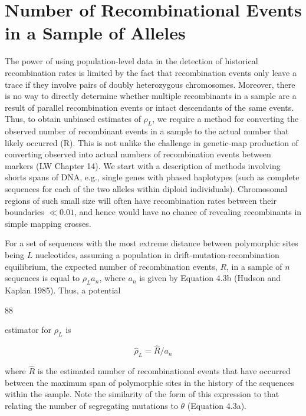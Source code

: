 \documentclass{article}
\begin{document}
\section{Number of Recombinational Events in a Sample of Alleles}
The power of using population-level data in the detection of historical recombination rates is limited by the fact that recombination events only leave a trace if they involve pairs of doubly heterozygous chromosomes. Moreover, there is no way to directly determine whether multiple recombinants in a sample are a result of parallel recombination events or intact descendants of the same events. Thus, to obtain unbiased estimates of  $ \rho_{L} $, we require a method for converting the observed number of recombinant events in a sample to the actual number that likely occurred (R). This is not unlike the challenge in genetic-map production of converting observed into actual numbers of recombination events between markers (LW Chapter 14). We start with a description of methods involving shorts spans of DNA, e.g., single genes with phased haplotypes (such as complete sequences for each of the two alleles within diploid individuals). Chromosomal regions of such small size will often have recombination rates between their boundaries  $ \ll 0.01 $, and hence would have no chance of revealing recombinants in simple mapping crosses.

For a set of sequences with the most extreme distance between polymorphic sites being  $ L $ nucleotides, assuming a population in drift-mutation-recombination equilibrium, the expected number of recombination events,  $ R $, in a sample of  $ n $ sequences is equal to  $ \rho_L a_n $, where  $ a_n $ is given by Equation 4.3b (Hudson and Kaplan 1985). Thus, a potential

88

estimator for  $ \rho_{L} $ is

\begin{equation}
\widehat{\rho}_{L}=\widehat{R}/a_{n}
\tag{4.7}
\label{eq:4_7}
\end{equation}

where  $ \widehat{R} $ is the estimated number of recombinational events that have occurred between the maximum span of polymorphic sites in the history of the sequences within the sample. Note the similarity of the form of this expression to that relating the number of segregating mutations to  $ \theta $ (Equation 4.3a).
\end{document}
